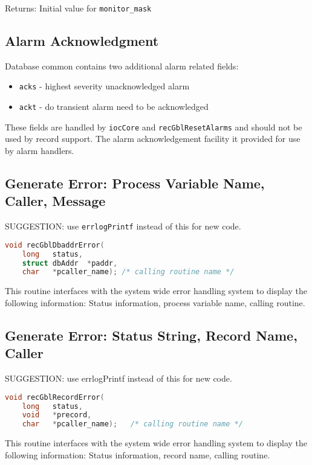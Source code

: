 Returns: Initial value for \verb|monitor_mask|

\subsection{Alarm Acknowledgment}

Database common contains two additional alarm related fields:

\begin{itemize}
\item \verb|acks| - highest severity unacknowledged alarm
\item \verb|ackt| - do transient alarm need to be acknowledged
\end{itemize}

These fields are handled by \verb|iocCore| and \verb|recGblResetAlarms| and should not be used by record support.
The alarm acknowledgement facility it provided for use by alarm handlers.

\subsection{Generate Error: Process Variable Name, Caller, Message}

SUGGESTION: use \verb|errlogPrintf| instead of this for new code.

\begin{lstlisting}[language=C]
void recGblDbaddrError(
    long   status,
    struct dbAddr  *paddr,
    char   *pcaller_name); /* calling routine name */
\end{lstlisting}

This routine interfaces with the system wide error handling system to display the following information:
Status information, process variable name, calling routine.

\subsection{Generate Error: Status String, Record Name, Caller}
SUGGESTION: use errlogPrintf instead of this for new code.
\begin{lstlisting}[language=C]
void recGblRecordError(
    long   status,
    void   *precord,
    char   *pcaller_name);   /* calling routine name */
\end{lstlisting}

This routine interfaces with the system wide error handling system to display the following information:
Status information, record name, calling routine.

